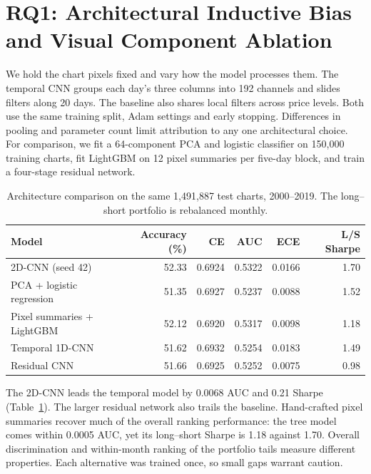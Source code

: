 \documentclass[10pt]{article}
\begin{document}
\section{RQ1: Architectural Inductive Bias and Visual Component Ablation}
We hold the chart pixels fixed and vary how the model processes them. The temporal CNN groups each day's three columns into 192 channels and slides filters along 20 days. The baseline also shares local filters across price levels. Both use the same training split, Adam settings and early stopping. Differences in pooling and parameter count limit attribution to any one architectural choice. For comparison, we fit a 64-component PCA and logistic classifier on 150,000 training charts, fit LightGBM on 12 pixel summaries per five-day block, and train a four-stage residual network.

\begin{table}[htbp]
\centering\small
\caption{Architecture comparison on the same 1,491,887 test charts, 2000--2019. The long--short portfolio is rebalanced monthly.}
\label{tab:sq1}
\begin{tabular}{lrrrrr}
\toprule
Model & Accuracy (\%) & CE & AUC & ECE & L/S Sharpe \\
\midrule
2D-CNN (seed 42) & 52.33 & 0.6924 & 0.5322 & 0.0166 & 1.70 \\
PCA + logistic regression & 51.35 & 0.6927 & 0.5237 & 0.0088 & 1.52 \\
Pixel summaries + LightGBM & 52.12 & 0.6920 & 0.5317 & 0.0098 & 1.18 \\
Temporal 1D-CNN & 51.62 & 0.6932 & 0.5254 & 0.0183 & 1.49 \\
Residual CNN & 51.66 & 0.6925 & 0.5252 & 0.0075 & 0.98 \\
\bottomrule
\end{tabular}
\end{table}

The 2D-CNN leads the temporal model by 0.0068 AUC and 0.21 Sharpe (Table~\ref{tab:sq1}). The larger residual network also trails the baseline. Hand-crafted pixel summaries recover much of the overall ranking performance: the tree model comes within 0.0005 AUC, yet its long--short Sharpe is 1.18 against 1.70. Overall discrimination and within-month ranking of the portfolio tails measure different properties. Each alternative was trained once, so small gaps warrant caution.
\end{document}
